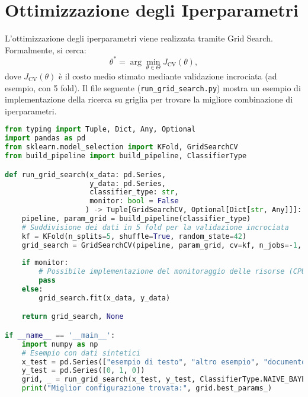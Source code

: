 \section{Ottimizzazione degli Iperparametri}
L'ottimizzazione degli iperparametri viene realizzata tramite Grid Search. Formalmente, si cerca:
\[
\theta^* = \arg \min_{\theta \in \Theta} J_{\text{CV}}(\theta),
\]
dove \(J_{\text{CV}}(\theta)\) è il costo medio stimato mediante validazione incrociata (ad esempio, con 5 fold).
Il file seguente (\texttt{run\_grid\_search.py}) mostra un esempio di implementazione della ricerca su griglia per trovare la migliore combinazione di iperparametri.

\begin{lstlisting}[language=Python]
from typing import Tuple, Dict, Any, Optional
import pandas as pd
from sklearn.model_selection import KFold, GridSearchCV
from build_pipeline import build_pipeline, ClassifierType

def run_grid_search(x_data: pd.Series,
                    y_data: pd.Series,
                    classifier_type: str,
                    monitor: bool = False
                   ) -> Tuple[GridSearchCV, Optional[Dict[str, Any]]]:
    pipeline, param_grid = build_pipeline(classifier_type)
    # Suddivisione dei dati in 5 fold per la validazione incrociata
    kf = KFold(n_splits=5, shuffle=True, random_state=42)
    grid_search = GridSearchCV(pipeline, param_grid, cv=kf, n_jobs=-1, verbose=0)
    
    if monitor:
        # Possibile implementazione del monitoraggio delle risorse (CPU, memoria, tempo)
        pass
    else:
        grid_search.fit(x_data, y_data)

    return grid_search, None

if __name__ == '__main__':
    import numpy as np
    # Esempio con dati sintetici
    x_test = pd.Series(["esempio di testo", "altro esempio", "documento di prova"])
    y_test = pd.Series([0, 1, 0])
    grid, _ = run_grid_search(x_test, y_test, ClassifierType.NAIVE_BAYES)
    print("Miglior configurazione trovata:", grid.best_params_)
\end{lstlisting}